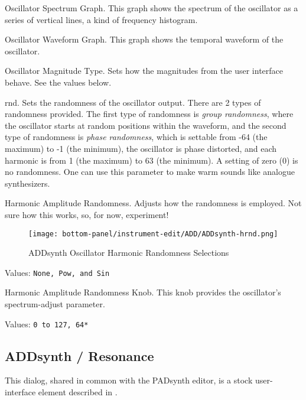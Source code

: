    \setcounter{ItemCounter}{0}      %

   Oscillator Spectrum Graph.
   This graph shows the spectrum of the oscillator as a series of vertical
   lines, a kind of frequency histogram.

   Oscillator Waveform Graph.
   This graph shows the temporal waveform  of the oscillator.

   Oscillator Magnitude Type.
   Sets how the magnitudes from the user interface behave.  See the values
   below.

   rnd. Sets the randomness of the oscillator output. There are 2 types of
   randomness provided.  The first type of randomness is
   \textsl{group randomness},
   where the oscillator starts at random positions within the waveform,
   and the second type of randomness is
   \textsl{phase randomness},
   which is settable from -64 (the maximum) to -1 (the minimum),
   the oscillator is phase distorted,
   and each harmonic is from 1 (the maximum) to 63 (the minimum).
   A setting of zero (0) is no randomness.
   One can use this parameter to make warm sounds like
   analogue synthesizers.

   Harmonic Amplitude Randomness.
   Adjusts how the randomness is employed.
   Not sure how this works, so, for now, experiment!

\begin{figure}[H]
   \centering
   \texttt{[image: bottom-panel/instrument-edit/ADD/ADDsynth-hrnd.png]}
   \caption{ADDsynth Oscillator Harmonic Randomness Selections}
   \label{fig:addsynth_hrnd}
\end{figure}

   Values: \texttt{None, Pow, and Sin}

   Harmonic Amplitude Randomness Knob.
   This knob provides the oscillator's spectrum-adjust parameter.

   Values: \texttt{0 to 127, 64*}

\subsection{ADDsynth / Resonance}
\label{subsec:addsynth_resonance}

   This dialog, shared in common with the PADsynth editor, is a stock
   user-interface element described in
   .

